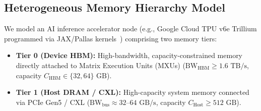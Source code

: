 \documentclass[conference,10pt]{IEEEtran}
\begin{document}
\subsection{Heterogeneous Memory Hierarchy Model}
We model an AI inference accelerator node (e.g., Google Cloud TPU v6e Trillium programmed via JAX/Pallas kernels~\cite{bradbury2018jax}) comprising two memory tiers:
\begin{itemize}
    \item \textbf{Tier 0 (Device HBM):} High-bandwidth, capacity-constrained memory directly attached to Matrix Execution Units (MXUs) ($\text{BW}_{\text{HBM}} \ge 1.6\text{ TB/s}$, capacity $C_{\text{HBM}} \in \{32, 64\}\text{ GB}$).
    \item \textbf{Tier 1 (Host DRAM / CXL):} High-capacity system memory connected via PCIe Gen5 / CXL ($\text{BW}_{\text{bus}} \approx 32\text{--}64\text{ GB/s}$, capacity $C_{\text{Host}} \ge 512\text{ GB}$).
\end{itemize}
\end{document}
